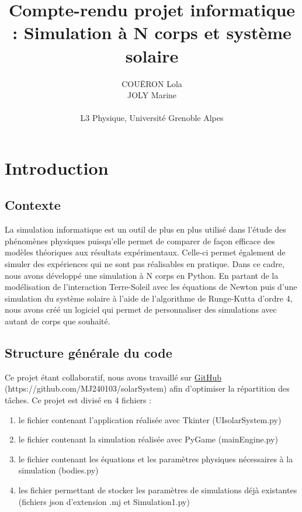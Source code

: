 \documentclass{article}
\title{Compte-rendu projet informatique : Simulation à N corps et système solaire}
\author{COUËRON Lola \\ JOLY Marine \\ \\ L3 Physique, Université Grenoble Alpes}
\begin{document}
\maketitle

{
\hypersetup{hidelinks}

\renewcommand{\contentsname}{Sommaire}
\tableofcontents
}

\section{Introduction}
    \subsection{Contexte}
    La simulation informatique est un outil de plus en plus utilisé dans l'étude des phénomènes physiques puisqu'elle permet de comparer de façon efficace des modèles théoriques aux résultats expérimentaux. Celle-ci permet également de simuler des expériences qui ne sont pas réalisables en pratique. Dans ce cadre, nous avons développé une simulation à N corps en Python. En partant de la modélisation de l'interaction Terre-Soleil avec les équations de Newton puis d'une simulation du système solaire à l'aide de l'algorithme de Runge-Kutta d'ordre 4, nous avons créé un logiciel qui permet de personnaliser des simulations avec autant de corps que souhaité.

    \subsection{Structure générale du code}
    Ce projet étant collaboratif, nous avons travaillé sur \href{https://github.com/MJ240103/solarSystem}{GitHub} (https://github.com/MJ240103/solarSystem) afin d'optimiser la répartition des tâches. Ce projet est divisé en 4 fichiers : \\

    \begin{enumerate}
        \item le fichier contenant l'application réalisée avec Tkinter (UIsolarSystem.py)
        \item le fichier contenant la simulation réalisée avec PyGame (mainEngine.py)
        \item le fichier contenant les équations et les paramètres physiques nécessaires à la simulation (bodies.py)
        \item les fichier permettant de stocker les paramètres de simulations déjà existantes (fichiers json d'extension .mj et Simulation1.py)
    \end{enumerate}
\end{document}
